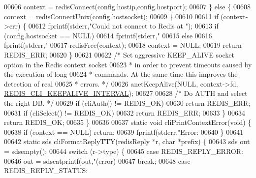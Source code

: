 \begin{DoxyCode}
{{{{{{{{{{{{{{00606             context = redisConnect(config.hostip,config.hostport);
00607         \} \textcolor{keywordflow}{else} \{
00608             context = redisConnectUnix(config.hostsocket);
00609         \}
00610 
00611         \textcolor{keywordflow}{if} (context->err) \{
00612             fprintf(stderr,\textcolor{stringliteral}{"Could not connect to Redis at "});
00613             \textcolor{keywordflow}{if} (config.hostsocket == NULL)
00614                 fprintf(stderr,\textcolor{stringliteral}{"%
00615             \textcolor{keywordflow}{else}
00616                 fprintf(stderr,\textcolor{stringliteral}{"%
00617             redisFree(context);
00618             context = NULL;
00619             \textcolor{keywordflow}{return} REDIS\_ERR;
00620         \}
00621 
00622         \textcolor{comment}{/* Set aggressive KEEP\_ALIVE socket option in the Redis context socket}
00623 \textcolor{comment}{         * in order to prevent timeouts caused by the execution of long}
00624 \textcolor{comment}{         * commands. At the same time this improves the detection of real}
00625 \textcolor{comment}{         * errors. */}
00626         anetKeepAlive(NULL, context->fd, \hyperlink{redis-cli_8c_a5405864d5b0d191cc176105325fab907}{REDIS\_CLI\_KEEPALIVE\_INTERVAL});
00627 
00628         \textcolor{comment}{/* Do AUTH and select the right DB. */}
00629         \textcolor{keywordflow}{if} (cliAuth() != REDIS\_OK)
00630             \textcolor{keywordflow}{return} REDIS\_ERR;
00631         \textcolor{keywordflow}{if} (cliSelect() != REDIS\_OK)
00632             \textcolor{keywordflow}{return} REDIS\_ERR;
00633     \}
00634     \textcolor{keywordflow}{return} REDIS\_OK;
00635 \}
00636 
00637 \textcolor{keyword}{static} \textcolor{keywordtype}{void} cliPrintContextError(\textcolor{keywordtype}{void}) \{
00638     \textcolor{keywordflow}{if} (context == NULL) \textcolor{keywordflow}{return};
00639     fprintf(stderr,\textcolor{stringliteral}{"Error: %
00640 \}
00641 
00642 \textcolor{keyword}{static} sds cliFormatReplyTTY(redisReply *r, \textcolor{keywordtype}{char} *prefix) \{
00643     sds out = sdsempty();
00644     \textcolor{keywordflow}{switch} (r->type) \{
00645     \textcolor{keywordflow}{case} REDIS\_REPLY\_ERROR:
00646         out = sdscatprintf(out,\textcolor{stringliteral}{"(error) %
00647     \textcolor{keywordflow}{break};
00648     \textcolor{keywordflow}{case} REDIS\_REPLY\_STATUS:
}}}}}}}}}}}}}}}}}}
\end{DoxyCode}
